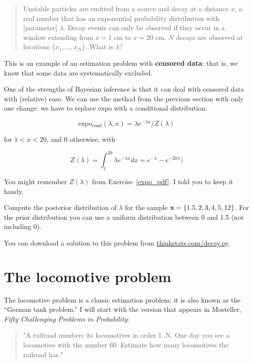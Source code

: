 \documentclass[12pt]{book}
\begin{document}
\begin{quote}

Unstable particles are emitted from a source and decay at a distance
$x$, a real number that has an exponential probability distribution
with [parameter] $\lambda$.  Decay events can
only be observed if they occur in a window extending from $x=1$ cm to
$x=20$ cm.  $N$ decays are observed at locations $\{ x_1, ... , x_N
\}$.  What is $\lambda$?

\end{quote}

This is an example of an estimation problem with {\bf censored data};
that is, we know that some data are systematically excluded.

One of the strengths of Bayesian inference is that it can deal with
censored data with (relative) ease.  We can use the method from the
previous section with only one change: we have to replace
$\mathrm{expo}$ with a conditional distribution:

\[ \mathrm{expo_{cond}}(\lambda, x) = \lambda e^{-\lambda x} / Z(\lambda)  \]

for $1 < x < 20$, and 0 otherwise, with

\[ Z(\lambda) = \int_1^{20} \lambda e^{-\lambda x} dx = 
e^{-\lambda} - e^{-20 \lambda} ) \]

You might remember $Z(\lambda)$ from Exercise~\ref{expo_pdf}.  I told
you to keep it handy.

\begin{ex}

Compute the posterior distribution of $\lambda$ for the sample
$\mathbf{x} = \{ 1.5, 2, 3, 4, 5, 12 \}$.  For the prior distribution you
can use a uniform distribution between 0 and 1.5 (not including 0).

\end{ex}

You can download a solution to this problem from
\url{thinkstats.com/decay.py}.


\section{The locomotive problem}

The locomotive problem is a classic estimation problem; it is also
known as the ``German tank problem.''  I will start with the version
that appears in Mosteller, {\it Fifty Challenging Problems in
  Probability}:

\begin{quote}
"A railroad numbers its locomotives in order 1..N.  One day you see a
locomotive with the number 60.  Estimate how many locomotives the
railroad has."
\end{quote}
\end{document}
